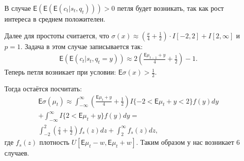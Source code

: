 \documentclass[12pt, twoside]{article}
\begin{document}
В случае $\mathsf{E}(\mathsf{E}(\mathsf{E}(c_t|s_t, q_t))) > 0$ петля будет возникать, так как рост интереса в среднем положителен. 

Далее для простоты считается, что $\sigma(x) \approx \left(\frac{x}{4} + \frac{1}{2} \right) \cdot I[-2, 2] + I[2, \infty]$ и $p = 1$.
Задача в этом случае записывается так:
\begin{gather*}
  \mathsf{E} (\mathsf{E} (c_t | s_t, q_t = y)) \approx  2 \left(\frac{\mathsf{E} \mu_{t-1} + y}{4} + \frac{1}{2}\right) - 1.   
\end{gather*}
Теперь петля возникает при условии: $\mathsf{E}\sigma(x) > \frac{1}{2}$. 

Тогда остаётся посчитать:
\begin{gather*}
  \mathsf{E} \sigma(\mu_t) \approx \int_{-\infty}^{\infty} \left(\frac{\mathsf{E} \mu_t + y}{4} + \frac{1}{2} \right) I\{-2 < \mathsf{E}\mu_t +y < 2\} f(y)dy \\
  + \int_{-\infty}^{\infty} I\{2 < \mathsf{E}\mu_t +y \}f(y) dy = \\
  \int_{-2}^{2} \left(\frac{z}{4} + \frac{1}{2} \right) f_s(z)dz 
  + \int_{2}^{\infty} f_s(z) dz,
\end{gather*}
где $f_s(z)$ плотность $U[\mathsf{E}\mu_t - w, \mathsf{E}\mu_t + w]$.
Таким образом у нас возникает $6$ случаев.
\end{document}
